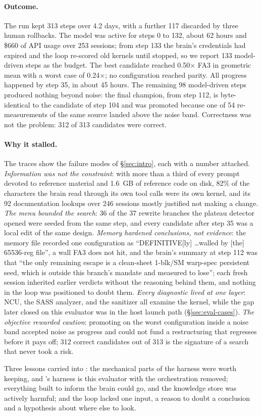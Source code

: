 \paragraph{Outcome.} The run kept 313 steps over 4.2 days, with a further 117 discarded by three
human rollbacks. The model was active for steps 0 to 132, about 62 hours and \$660 of API usage over
253 sessions; from step 133 the brain's credentials had expired and the loop re-scored old kernels
until stopped, so we report 133 model-driven steps as the budget. The best candidate reached
0.50$\times$ FA3 in geometric mean with a worst case of 0.24$\times$; no configuration reached
parity. All progress happened by step 35, in about 45 hours. The remaining 98 model-driven steps
produced nothing beyond noise: the final champion, from step 112, is byte-identical to the candidate
of step 104 and was promoted because one of 54 re-measurements of the same source landed above the
noise band. Correctness was not the problem: 312 of 313 candidates were correct.

\paragraph{Why it stalled.} The traces show the failure modes of \S\ref{sec:intro}, each with a
number attached. \emph{Information was not the constraint}: with more than a third of every prompt
devoted to reference material and 1.6~GB of reference code on disk, 82\% of the characters the brain
read through its own tool calls were its own kernel, and its 92 documentation lookups over 246
sessions mostly justified not making a change. \emph{The menu bounded the search}: 36 of the 37
rewrite branches the plateau detector opened were seeded from the same step, and every candidate
after step 35 was a local edit of the same design. \emph{Memory hardened conclusions, not evidence}:
the memory file recorded one configuration as ``DEFINITIVE[ly] \ldots walled by [the] 65536-reg
file'', a wall FA3 does not hit, and the brain's summary at step 112 was that ``the only remaining
escape is a clean-sheet 1-blk/SM warp-spec persistent seed, which is outside this branch's mandate
and measured to lose''; each fresh session inherited earlier verdicts without the reasoning behind
them, and nothing in the loop was positioned to doubt them. \emph{Every diagnostic lived at one
layer}: NCU, the SASS analyzer, and the sanitizer all examine the kernel, while the gap \sys later
closed on this evaluator was in the host launch path (\S\ref{sec:eval-cases}). \emph{The objective
rewarded caution}: promoting on the worst configuration inside a noise band accepted noise as
progress and could not fund a restructuring that regresses before it pays off; 312 correct
candidates out of 313 is the signature of a search that never took a risk.

Three lessons carried into \sys: the mechanical parts of the harness were worth keeping, and
\sys's harness is this evaluator with the orchestration removed; everything built to inform the
brain could go, and the knowledge store was actively harmful; and the loop lacked one input, a
reason to doubt a conclusion and a hypothesis about where else to look.
